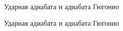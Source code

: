 \documentclass[12pt]{article}
\begin{document}
\begin{figure}[H]
\caption{Ударная адиабата и адиабата Гюгонио}
\label{hugoniotpic}
\end{figure}

\begin{figure}[H]
\caption{Ударная адиабата и адиабата Гюгонио}
\label{detonationpic}
\end{figure}
\end{document}
